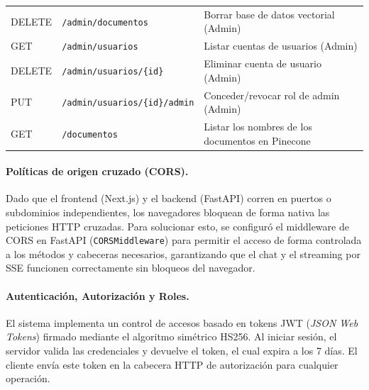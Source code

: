 \documentclass[12pt,a4paper,oneside]{report}
\begin{document}
\begin{table}[H]
\begin{tabular}{@{}lp{5.3cm}p{7.5cm}@{}}
        DELETE          & \texttt{/admin/documentos}                       & Borrar base de datos vectorial (Admin)        \\
        GET             & \texttt{/admin/usuarios}                         & Listar cuentas de usuarios (Admin)            \\
        DELETE          & \texttt{/admin/usuarios/\allowbreak\{\allowbreak{}id\}}                          & Eliminar cuenta de usuario (Admin)            \\
        PUT             & \texttt{/admin/usuarios/\allowbreak\{\allowbreak{}id\}/\allowbreak{}admin}      & Conceder/revocar rol de admin (Admin)         \\
        GET             & \texttt{/documentos}                             & Listar los nombres de los documentos en Pinecone \\
        \bottomrule
    \end{tabular}
\end{table}

\paragraph{Políticas de origen cruzado (CORS).} Dado que el frontend (Next.js) y el backend (FastAPI) corren en puertos o subdominios independientes, los navegadores bloquean de forma nativa las peticiones HTTP cruzadas. Para solucionar esto, se configuró el middleware de CORS en FastAPI (\texttt{CORSMiddleware}) para permitir el acceso de forma controlada a los métodos y cabeceras necesarios, garantizando que el chat y el streaming por SSE funcionen correctamente sin bloqueos del navegador.

\paragraph{Autenticación, Autorización y Roles.} El sistema implementa un control de accesos basado en tokens JWT (\textit{JSON Web Tokens}) firmado mediante el algoritmo simétrico HS256. Al iniciar sesión, el servidor valida las credenciales y devuelve el token, el cual expira a los 7 días. El cliente envía este token en la cabecera HTTP de autorización para cualquier operación.
\end{document}
